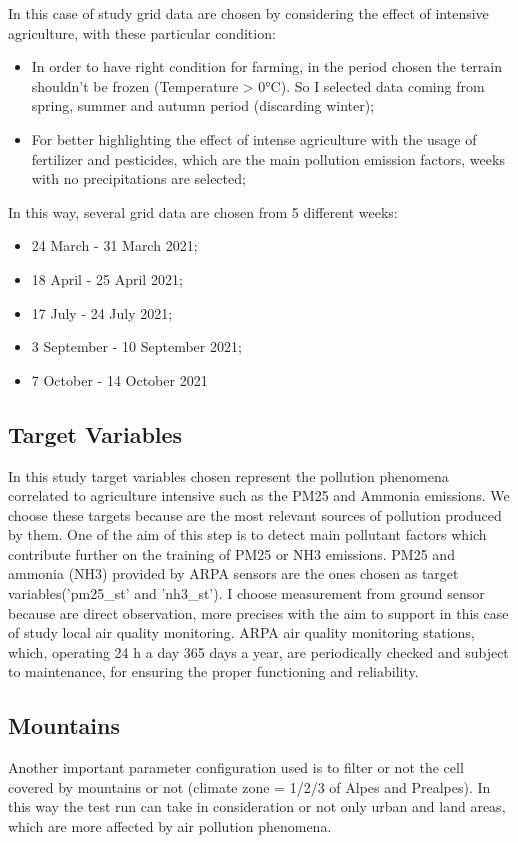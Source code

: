 In this case of study grid data are chosen by considering the effect of intensive agriculture, with these particular condition:
    \begin{itemize}
        \item In order to have right condition for farming, in the period chosen the terrain shouldn't be frozen (Temperature > 0°C). So I selected data coming from spring, summer and autumn period (discarding winter);
        \item For better highlighting the effect of intense agriculture with the usage of fertilizer and pesticides, which are the main pollution emission factors, weeks with no precipitations are selected;
\end{itemize}
In this way, several grid data are chosen from 5 different weeks:
\begin{itemize}
    \item 24 March - 31 March 2021;
    \item 18 April - 25 April 2021;
    \item 17 July - 24 July 2021;
    \item 3 September - 10 September 2021;
    \item 7 October - 14 October 2021
\end{itemize}

\subsection{Target Variables}
In this study target variables chosen represent the pollution phenomena correlated to agriculture intensive  such as the PM25 and Ammonia emissions. We choose these targets because are the most relevant sources of pollution produced by them.\newline
One of the aim of this step is to detect main pollutant factors which contribute further on the training of PM25 or NH3 emissions.
PM25 and ammonia (NH3) provided by ARPA sensors are the ones chosen as target variables('pm25\_st' and 'nh3\_st').
I choose measurement from ground sensor because are direct observation, more precises with the aim to support in this case of study local air quality monitoring. 
ARPA air quality monitoring stations, which, operating 24 h a day 365 days a year, are periodically checked and subject to maintenance, for ensuring the proper functioning and reliability.

\subsection{Mountains}
Another important parameter configuration used is to filter or not the cell covered by mountains or not (climate zone = 1/2/3 of Alpes and Prealpes). In this way the test run can take in consideration or not only urban and land areas, which are more affected by air pollution phenomena.

